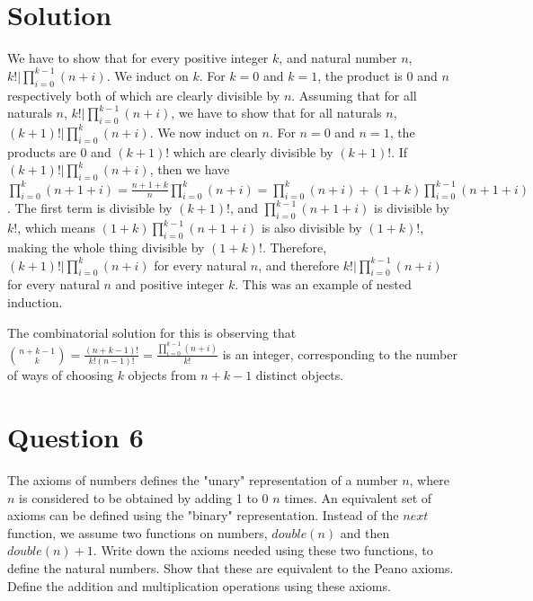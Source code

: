 \documentclass[12pt]{report}
\begin{document}
\section*{Solution}
We have to show that for every positive integer $k$, and natural number $n$, $k! | \prod\limits_{i = 0}^{k - 1}(n + i)$. We induct on $k$. For $k = 0$ and $k = 1$, the product is $0$ and $n$ respectively both of which are clearly divisible by $n$. Assuming that for all naturals $n$, $k! | \prod\limits_{i = 0}^{k - 1}(n + i)$, we have to show that for all naturals $n$, $(k + 1)! | \prod\limits_{i = 0}^{k}(n + i)$. We now induct on $n$. For $n = 0$ and $n = 1$, the products are $0$ and $(k + 1)!$ which are clearly divisible by $(k + 1)!$. If $(k + 1)! | \prod\limits_{i = 0}^{k}(n + i)$, then we have $\prod\limits_{i = 0}^{k}(n + 1 + i) = \frac{n + 1 + k}{n}\prod\limits_{i = 0}^{k}(n + i) = \prod\limits_{i = 0}^{k}(n + i) + (1 + k)\prod\limits_{i = 0}^{k - 1}(n + 1+ i)$. The first term is divisible by $(k + 1)!$, and $\prod\limits_{i = 0}^{k - 1}(n + 1 + i)$ is divisible by $k!$, which means $(1 + k)\prod\limits_{i = 0}^{k - 1}(n + 1 + i)$ is also divisible by $(1 + k)!$, making the whole thing divisible by $(1 + k)!$. Therefore, $(k + 1)! | \prod\limits_{i = 0}^{k}(n + i)$ for every natural $n$, and therefore $k! | \prod\limits_{i = 0}^{k - 1}(n + i)$ for every natural $n$ and positive integer $k$. This was an example of nested induction.

The combinatorial solution for this is observing that $\binom{n + k - 1}{k} = \frac{(n + k - 1)!}{k!(n - 1)!} = \frac{\prod_{i = 0}^{k - 1}(n + i)}{k!}$ is an integer, corresponding to the number of ways of choosing $k$ objects from $n + k - 1$ distinct objects.
\section*{Question 6}
The axioms of numbers defines the "unary" representation of a number $n$, where $n$ is considered to be obtained by adding 1 to 0 $n$ times.  An equivalent set of axioms can be defined using the "binary" representation. Instead of the $next$ function, we assume two functions on numbers, $double(n)$ and then $double(n) + 1$. Write down the axioms needed using these two functions, to define the natural numbers. Show that these are equivalent to the Peano
axioms. Define the addition and multiplication operations using these axioms.
\end{document}
